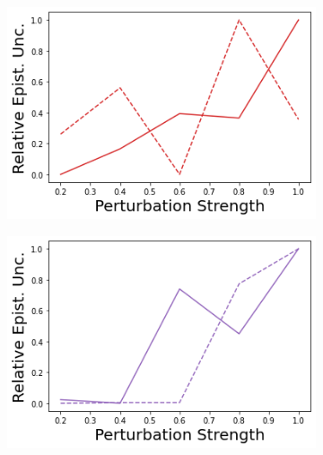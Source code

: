 \begin{figure}
    \begin{subfigure}{.24\textwidth}
        \includegraphics[width=\textwidth]{sections/011_icml2022/resources/transition_shift-DropOut-AcrobotShift-v0-mean_epistemic_uncertainty_.png}
    \end{subfigure}
    \begin{subfigure}{.24\textwidth}
        \includegraphics[width=\textwidth]{sections/011_icml2022/resources/transition_shift-Ensemble-AcrobotShift-v0-mean_epistemic_uncertainty_.png}
    \end{subfigure}
    \begin{subfigure}{.24\textwidth}

\end{subfigure}
\end{figure}
